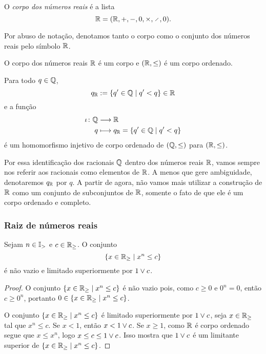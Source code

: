 \begin{definition}
O \emph{corpo dos números reais} é a lista
	\begin{equation*}
	\R = (\R,+,-,0,\times,\div,0).
	\end{equation*}
\end{definition}

Por abuso de notação, denotamos tanto o corpo como o conjunto dos números reais pelo símbolo $\mathbb{R}$.

\begin{exercise}
O corpo dos números reais $\mathbb{R}$ é um corpo e $(\mathbb{R},\leq)$ é um corpo ordenado.
\end{exercise}

\begin{exercise}
Para todo $q \in \mathbb{Q}$,
	\begin{equation*}
	q_{\mathbb{R}} := \left\{{q' \in \mathbb{Q}}\;\middle\vert\;{q' < q}\right\} \in \mathbb{R}
	\end{equation*}
e a função
	\begin{align*}
	{\iota}\colon {\mathbb{Q}} &\longrightarrow {\mathbb{R}} \\{q} &\longmapsto q_{\mathbb{R}} = \left\{{q' \in \mathbb{Q}}\;\middle\vert\;{q' < q}\right\}
	\end{align*}
é um homomorfismo injetivo de corpo ordenado de $(\mathbb{Q},\leq)$ para $(\mathbb{R},\leq)$.
\end{exercise}

Por essa identificação dos racionais $\mathbb{Q}$ dentro dos números reais $\mathbb{R}$, vamos sempre nos referir aos racionais como elementos de $\mathbb{R}$. A menos que gere ambiguidade, denotaremos $q_{\mathbb{R}}$ por $q$. A partir de agora, não vamos mais utilizar a construção de $\mathbb{R}$ como um conjunto de subconjuntos de $\mathbb{R}$, somente o fato de que ele é um corpo ordenado e completo.

\subsubsection{Raiz de números reais}

\begin{proposition}
Sejam $n \in \mathbb{I}_{>}$ e $c \in \mathbb{R}_{\geq}$. O conjunto
	\begin{equation*}
	\left\{{x \in \mathbb{R}_{\geq}}\;\middle\vert\;{x^n \leq c}\right\}
	\end{equation*}
é não vazio e limitado superiormente por $1 \mathbin{\vee} c$.
\end{proposition}
\begin{proof}
O conjunto $\left\{{x \in \mathbb{R}_{\geq}}\;\middle\vert\;{x^n \leq c}\right\}$ é não vazio pois, como $c \geq 0$ e $0^n=0$, então $c \geq 0^n$, portanto $0 \in \left\{{x \in \mathbb{R}_{\geq}}\;\middle\vert\;{x^n \leq c}\right\}$.

O conjunto $\left\{{x \in \mathbb{R}_{\geq}}\;\middle\vert\;{x^n \leq c}\right\}$ é limitado superiormente por $1 \mathbin{\vee} c$, seja $x \in \mathbb{R}_{\geq}$ tal que $x^n \leq c$. Se $x<1$, então $x < 1 \mathbin{\vee} c$. Se $x \geq 1$, como $\mathbb{R}$ é corpo ordenado segue que $x \leq x^n$, logo $x \leq c \leq 1 \mathbin{\vee} c$. Isso mostra que $1 \mathbin{\vee} c$ é um limitante superior de $\left\{{x \in \mathbb{R}_{\geq}}\;\middle\vert\;{x^n \leq c}\right\}$.
\end{proof}

